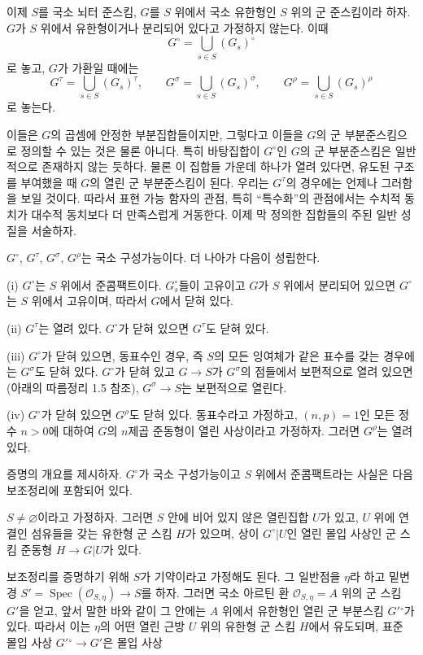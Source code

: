 이제 $S$를 국소 뇌터 준스킴, $G$를 $S$ 위에서 국소 유한형인 $S$ 위의
군 준스킴이라 하자. $G$가 $S$ 위에서 유한형이거나 분리되어 있다고
가정하지 않는다. 이때
\[
G^\circ=\bigcup_{s\in S}(G_s)^\circ
\]
로 놓고, $G$가 가환일 때에는
\[
G^\tau=\bigcup_{s\in S}(G_s)^\tau,
\qquad
G^\sigma=\bigcup_{s\in S}(G_s)^\sigma,
\qquad
G^\rho=\bigcup_{s\in S}(G_s)^\rho
\]
로 놓는다.

이들은 $G$의 곱셈에 안정한 부분집합들이지만, 그렇다고 이들을 $G$의 군
부분준스킴으로 정의할 수 있는 것은 물론 아니다. 특히 바탕집합이
$G^\circ$인 $G$의 군 부분준스킴은 일반적으로 존재하지 않는 듯하다.
물론 이 집합들 가운데 하나가 열려 있다면, 유도된 구조를 부여했을 때
$G$의 열린 군 부분준스킴이 된다. 우리는 $G^\tau$의 경우에는 언제나
그러함을 보일 것이다. 따라서 표현 가능 함자의 관점, 특히 ``특수화''의
관점에서는 수치적 동치가 대수적 동치보다 더 만족스럽게 거동한다. 이제
막 정의한 집합들의 주된 일반 성질을 서술하자.

 $G^\circ$, $G^\tau$, $G^\sigma$, $G^\rho$는 국소
구성가능이다. 더 나아가 다음이 성립한다.

\noindent (i) $G^\circ$는 $S$ 위에서 준콤팩트이다. $G_s^\circ$들이
고유이고 $G$가 $S$ 위에서 분리되어 있으면 $G^\circ$는 $S$ 위에서
고유이며, 따라서 $G$에서 닫혀 있다.

\noindent (ii) $G^\tau$는 열려 있다. $G^\circ$가 닫혀 있으면
$G^\tau$도 닫혀 있다.

\noindent (iii) $G^\circ$가 닫혀 있으면, 동표수인 경우, 즉 $S$의 모든
잉여체가 같은 표수를 갖는 경우에는 $G^\sigma$도 닫혀 있다.
$G^\circ$가 닫혀 있고 $G\longrightarrow S$가 $G^\sigma$의 점들에서
보편적으로 열려 있으면(아래의 따름정리 1.5 참조),
$G^\sigma\longrightarrow S$는 보편적으로 열린다.

\noindent (iv) $G^\circ$가 닫혀 있으면 $G^\rho$도 닫혀 있다.
동표수라고 가정하고, $(n,p)=1$인 모든 정수 $n>0$에 대하여 $G$의
$n$제곱 준동형이 열린 사상이라고 가정하자. 그러면 $G^\rho$는 열려 있다.

증명의 개요를 제시하자. $G^\circ$가 국소 구성가능이고 $S$ 위에서
준콤팩트라는 사실은 다음 보조정리에 포함되어 있다.

 $S\neq\varnothing$이라고 가정하자. 그러면
$S$ 안에 비어 있지 않은 열린집합 $U$가 있고, $U$ 위에 연결인 섬유들을
갖는 유한형 군 스킴 $H$가 있으며, 상이 $G^\circ|U$인 열린 몰입 사상인
군 스킴 준동형 $H\longrightarrow G|U$가 있다.

보조정리를 증명하기 위해 $S$가 기약이라고 가정해도 된다. 그 일반점을
$\eta$라 하고 밑변경
$S'=\operatorname{Spec}(\mathcal O_{S,\eta})\longrightarrow S$를 하자.
그러면 국소 아르틴 환 $\mathcal O_{S,\eta}=A$ 위의 군 스킴 $G'$을 얻고,
앞서 말한 바와 같이 그 안에는 $A$ 위에서 유한형인 열린 군 부분스킴
$G'{}^\circ$가 있다. 따라서 이는 $\eta$의 어떤 열린 근방 $U$ 위의
유한형 군 스킴 $H$에서 유도되며, 표준 몰입 사상
$G'{}^\circ\longrightarrow G'$은 몰입 사상

